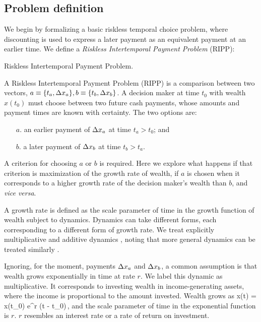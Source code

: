 \subsection{Problem definition}\label{sec:problem}

We begin by formalizing a basic riskless temporal choice problem, where discounting is used to express a later payment as an equivalent payment at an earlier time. We define a {\it Riskless Intertemporal Payment Problem} (RIPP):

\begin{definition}{Riskless Intertemporal Payment Problem.}

A Riskless Intertemporal Payment Problem (RIPP) is a comparison between two vectors, $a \equiv \{t_a,\Delta x_a\} , b \equiv \{ t_b,\Delta x_b \}$. A decision maker at time $t_0$ with wealth $x\left(t_0\right)$ must choose between two future cash payments, whose amounts and payment times are known with certainty. The two options are:
%
\begin{enumerate}
\item[$a$.] an earlier payment of $\Delta x_a$ at time $t_a>t_0$; and
\item[$b$.] a later payment of $\Delta x_b$ at time $t_b>t_a$.
\end{enumerate}
%
\end{definition}

A criterion for choosing $a$ or $b$ is required. Here we explore what happens if that criterion is maximization of the growth rate of wealth, \ie if $a$ is chosen when it corresponds to a higher growth rate of the decision maker's wealth than $b$, and \textit{vice versa}.

A growth rate is defined as the scale parameter of time in the growth function of wealth subject to dynamics. Dynamics can take different forms, each corresponding to a different form of growth rate. We treat explicitly multiplicative and additive dynamics \citep{PetersGell-Mann2016}, noting that more general dynamics can be treated similarly \citep{PetersAdamou2018a}.

Ignoring, for the moment, payments $\Delta x_a$ and $\Delta x_b$, a common assumption is that wealth grows exponentially in time at rate $r$. We label this dynamic as multiplicative. It corresponds to investing wealth in income-generating assets, where the income is proportional to the amount invested. Wealth grows as
%
\be
x\left(t\right) = x\left(t_0\right) e^{r \left(t - t_0\right)}\,,
\ee
%
and the scale parameter of time in the exponential function is $r$. $r$ resembles an interest rate or a rate of return on investment.

